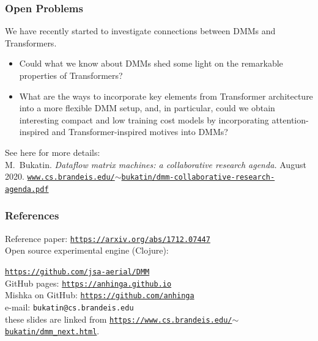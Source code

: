 \documentclass{beamer}
\begin{document}
\begin{frame}

   \frametitle{Open Problems}

   We have recently started to investigate connections between DMMs and Transformers.\\[2ex]

   \begin{itemize}
   \item Could what we know about DMMs shed some light on the remarkable properties of Transformers?
   \item What are the ways to incorporate key elements from Transformer architecture into a more flexible DMM setup, 
           and, in particular, could we obtain interesting compact and low training cost models by 
           incorporating attention-inspired and Transformer-inspired motives into DMMs?\\[2ex]
\end{itemize}

   See here for more details:\\[2ex]

   {\small M.~Bukatin.
{\em Dataflow matrix machines: a collaborative research agenda.} August 2020.}
\href{https://www.cs.brandeis.edu/~bukatin/dmm-collaborative-research-agenda.pdf}{\tt\scriptsize www.cs.brandeis.edu/$\sim$bukatin/dmm-collaborative-research-agenda.pdf}

\end{frame}

\begin{frame}

  \frametitle{References}

Reference paper: \href{https://arxiv.org/abs/1712.07447}{\tt\footnotesize  https://arxiv.org/abs/1712.07447}\\[2ex]

Open source experimental engine (Clojure):

\href{https://github.com/jsa-aerial/DMM}{\tt\footnotesize https://github.com/jsa-aerial/DMM}\\[2ex]

GitHub pages: \href{https://anhinga.github.io}{\tt\footnotesize  https://anhinga.github.io}\\[2ex]

Mishka on GitHub: \href{https://github.com/anhinga}{\tt\footnotesize https://github.com/anhinga}\\[2ex]

e-mail: {\tt\footnotesize bukatin@cs.brandeis.edu}\\[2ex]

these slides are linked from \href{https://www.cs.brandeis.edu/~bukatin/dmm\_next.html}{\tt\footnotesize https://www.cs.brandeis.edu/$\sim$bukatin/dmm\_next.html}.


\end{frame}
\end{document}

